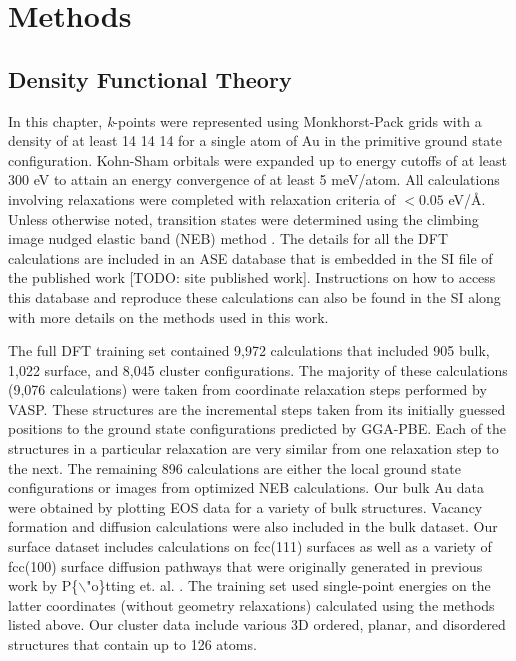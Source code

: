 \documentclass[12pt]{cmuthesis}
\begin{document}
\section{Methods}
\label{sec:org12c3e4a}
\subsection{Density Functional Theory}
\label{sec:org7b2314a}
In this chapter, \emph{k}-points were represented using Monkhorst-Pack grids \cite{monkhorst-1976-special-point} with a density of at least 14 \texttimes{} 14 \texttimes{} 14 for a single atom of Au in the primitive ground state configuration. Kohn-Sham orbitals were expanded up to energy cutoffs of at least 300 eV to attain an energy convergence of at least 5 meV/atom. All calculations involving relaxations were completed with relaxation criteria of \(< 0.05\) eV/\AA{}. Unless otherwise noted, transition states were determined using the climbing image nudged elastic band (NEB) method \cite{henkelman-2000}. The details for all the DFT calculations are included in an ASE database that is embedded in the SI file of the published work [TODO: site published work]. Instructions on how to access this database and reproduce these calculations can also be found in the SI along with more details on the methods used in this work.

The full DFT training set contained 9,972 calculations that included 905 bulk, 1,022 surface, and 8,045 cluster configurations. The majority of these calculations (9,076 calculations) were taken from coordinate relaxation steps performed by VASP. These structures are the incremental steps taken from its initially guessed positions to the ground state configurations predicted by GGA-PBE. Each of the structures in a particular relaxation are very similar from one relaxation step to the next. The remaining 896 calculations are either the local ground state configurations or images from optimized NEB calculations. Our bulk Au data were obtained by plotting EOS data for a variety of bulk structures. Vacancy formation and diffusion calculations were also included in the bulk dataset. Our surface dataset includes calculations on fcc(111) surfaces as well as a variety of fcc(100) surface diffusion pathways that were originally generated in previous work by P\{$\backslash$"o\}tting et. al. \cite{potting-2010-self-diffus}. The training set used single-point energies on the latter coordinates (without geometry relaxations) calculated using the methods listed above. Our cluster data include various 3D ordered, planar, and disordered structures that contain up to 126 atoms.
\end{document}
